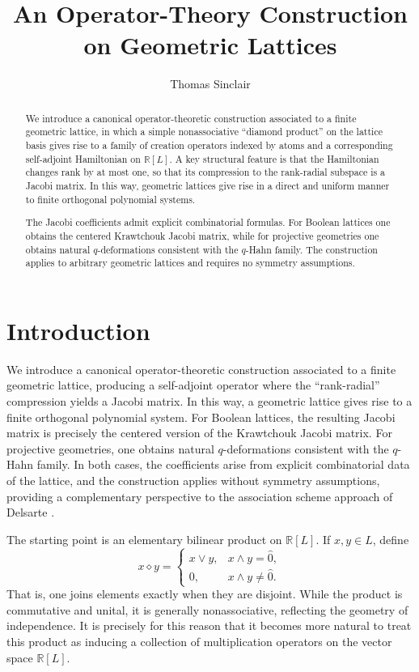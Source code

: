 \documentclass[11pt]{amsart}
\title[An Operator-Theory Construction on Geometric Lattices]{An Operator-Theory Construction\\ on Geometric Lattices}
\author[T.\ Sinclair]{Thomas Sinclair}
\theoremstyle{definition}
\newcommand{\R}{\mathbb{R}}
\newcommand{\zero}{\hat{0}}
\begin{document}
\begin{abstract}
    We introduce a canonical operator-theoretic construction associated to a finite geometric lattice, in which a simple nonassociative ``diamond product'' on the lattice basis gives rise to a family of creation operators indexed by atoms and a corresponding self-adjoint Hamiltonian on $\R[L]$.  A key structural feature is that the Hamiltonian changes rank by at most one, so that its compression to the rank-radial subspace is a Jacobi matrix.  In this way, geometric lattices give rise in a direct and uniform manner to finite orthogonal polynomial systems.

    The Jacobi coefficients admit explicit combinatorial formulas.  For Boolean lattices one obtains the centered Krawtchouk Jacobi matrix, while for projective geometries one obtains natural $q$-deformations consistent with the $q$-Hahn family.  The construction applies to arbitrary geometric lattices and requires no symmetry assumptions.
\end{abstract}

\maketitle


\section{Introduction}

We introduce a canonical operator-theoretic construction associated to a finite geometric lattice, producing a self-adjoint operator where the ``rank-radial'' compression yields a Jacobi matrix.  In this way, a geometric lattice gives rise to a finite orthogonal polynomial system.  For Boolean lattices, the resulting Jacobi matrix is precisely the centered version of the Krawtchouk Jacobi matrix.  For projective geometries, one obtains natural $q$-deformations consistent with the $q$-Hahn family.  In both cases, the coefficients arise from explicit combinatorial data of the lattice, and the construction applies without symmetry assumptions, providing a complementary perspective to the association scheme approach of Delsarte \cites{Delsarte, DelsarteGoethals,BannaiIto}.

The starting point is an elementary bilinear product on $\R[L]$.  If $x,y\in L$, define
\[
x\diamond y=
\begin{cases}
x\vee y,& x\wedge y=\zero,\\
0,& x\wedge y\neq \zero.
\end{cases}
\]
That is, one joins elements exactly when they are disjoint. While the product is commutative and unital, it is generally nonassociative, reflecting the geometry of independence. It is precisely for this reason that it becomes more natural to treat this product as inducing a collection of multiplication operators on the vector space $\R[L]$. 
\end{document}
